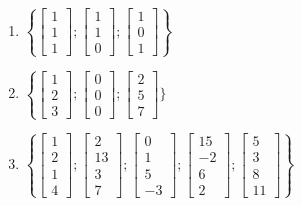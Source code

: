 \begin{enumerate}


\item
$\left\{ \left[ \begin{array}{c} 1 \\ 1 \\ 1 \end{array} \right]; 
\left[ \begin{array}{c} 1 \\ 1 \\ 0 \end{array} \right]; 
\left[ \begin{array}{c} 1 \\ 0 \\ 1 \end{array} \right] \right\}
$


\item
$\left\{\left[ \begin{array}{c} 1 \\ 2 \\ 3 \end{array} \right] ; 
\left[ \begin{array}{c} 0 \\ 0 \\ 0 \end{array} \right] ; 
\left[ \begin{array}{c} 2 \\ 5 \\ 7 \end{array} \right]\} $



\item
$\left\{\left[ \begin{array}{c} 1 \\ 2 \\ 1 \\ 4\end{array} \right] ; 
\left[ \begin{array}{c} 2 \\ 13 \\ 3 \\ 7\end{array} \right] ; 
\left[ \begin{array}{c} 0 \\ 1 \\ 5 \\ -3\end{array} \right] ;
\left[ \begin{array}{c} 15 \\ -2 \\ 6 \\ 2\end{array} \right] ;
\left[ \begin{array}{c} 5 \\ 3 \\ 8 \\ 11\end{array} \right] \right\} $




\end{enumerate}
